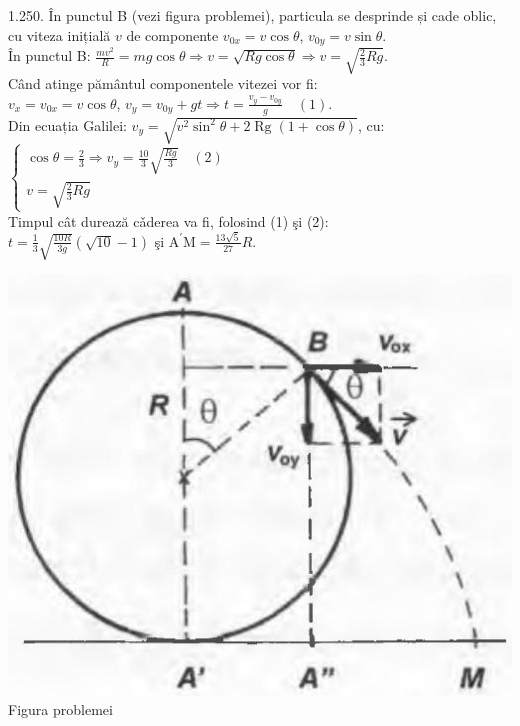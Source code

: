 1.250. În punctul B (vezi figura problemei), particula se desprinde și cade oblic, cu viteza inițială $v$ de componente $v_{0 x}=v \cos \theta$, $v_{0 y}=v \sin \theta$.\\ În punctul B: $\frac{m v^{2}}{R}=m g \cos \theta \Rightarrow v=\sqrt{R g \cos \theta} \Rightarrow v=\sqrt{\frac{2}{3} R g}$.\\ Când atinge pământul componentele vitezei vor fi:\\ $v_{x}=v_{0 x}=v \cos \theta$, $v_{y}=v_{0 y}+g t \Rightarrow t=\frac{v_{y}-v_{0 y}}{g} \quad (1)$.\\ Din ecuația Galilei: $v_{y}=\sqrt{v^{2} \sin ^{2} \theta+2 \operatorname{Rg}(1+\cos \theta)}$, cu:\\ $\left\{\begin{array}{l} \cos \theta=\frac{2}{3} \Rightarrow v_{y}=\frac{10}{3} \sqrt{\frac{R g}{3}} \quad (2)\\ v=\sqrt{\frac{2}{3} R g} \end{array}\right.$\\ Timpul cât durează cǎderea va fi, folosind (1) şi (2):\\ $t=\frac{1}{3} \sqrt{\frac{10 R}{3 g}}(\sqrt{10}-1)$ şi $\mathrm{A}^{\prime} \mathrm{M}=\frac{13 \sqrt{5}}{27} R$.\\ \begin{center} \includegraphics[width=0.4\linewidth]{images/2025_07_01_5b3ff9fa0d508c8e9f17g-250}\\ Figura problemei \end{center}\\

